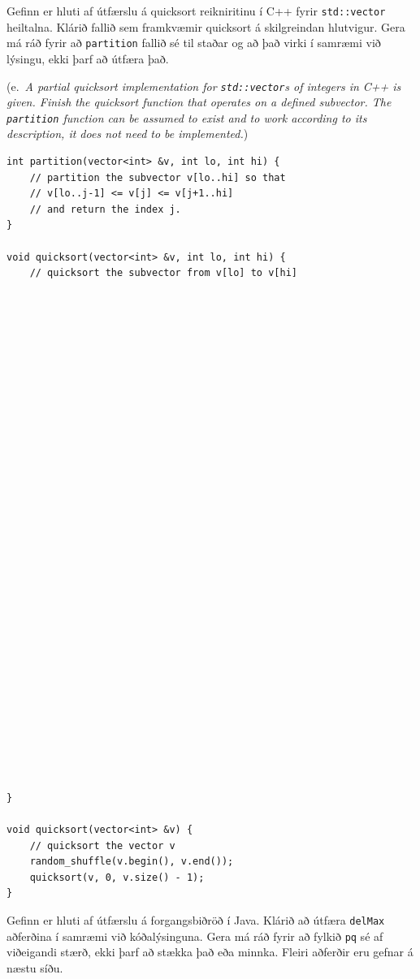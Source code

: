\documentclass[addpoints]{exam}
\newcommand{\eng}[1]{(e.\ \emph{#1})}
\begin{document}
\begin{questions}



	\question[4] Gefinn er hluti af útfærslu á quicksort reikniritinu í C++ fyrir \texttt{std::vector} heiltalna. Klárið fallið sem framkvæmir quicksort á skilgreindan hlutvigur. Gera má ráð fyrir að \texttt{partition} fallið sé til staðar og að það virki í samræmi við lýsingu, ekki þarf að útfæra það.

	\eng{A partial quicksort implementation for \texttt{std::vector}s of integers in C++ is given. Finish the quicksort function that operates on a defined subvector. The \texttt{partition} function can be assumed to exist and to work according to its description, it does not need to be implemented.}

	\begin{verbatim}
int partition(vector<int> &v, int lo, int hi) {
    // partition the subvector v[lo..hi] so that 
    // v[lo..j-1] <= v[j] <= v[j+1..hi] 
    // and return the index j.
}

void quicksort(vector<int> &v, int lo, int hi) {
    // quicksort the subvector from v[lo] to v[hi]
    
    
    
    
    
    
    
    
    
    
    
    
    
    
    
    
    
    
    
    
    
    
    
    
    
    
    
    
    
    
    
    
}

void quicksort(vector<int> &v) {
    // quicksort the vector v
    random_shuffle(v.begin(), v.end());
    quicksort(v, 0, v.size() - 1);
}
\end{verbatim}

	\question[4] Gefinn er hluti af útfærslu á forgangsbiðröð í Java. Klárið að útfæra \texttt{delMax} aðferðina í samræmi við kóðalýsinguna. Gera má ráð fyrir að fylkið \texttt{pq} sé af viðeigandi stærð, ekki þarf að stækka það eða minnka. Fleiri aðferðir eru gefnar á næstu síðu.


\end{questions}
\end{document}
